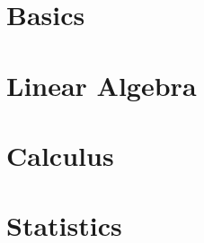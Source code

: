 \section[Basics]{Basics}

	
	
	

	

	

	

	


\section[LinAlg]{Linear Algebra}

	
	


	

	

	

	
	


\section[Calculus]{Calculus}

	
	

	

	

	

	

\section[Stats]{Statistics}

	

	

	

